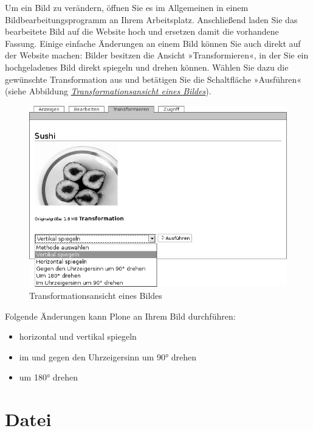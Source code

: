 \documentclass[a4paper,12pt,ngerman]{manual}
\begin{document}
Um ein Bild zu verändern, öffnen Sie es im Allgemeinen in einem
Bildbearbeitungsprogramm an Ihrem Arbeitsplatz. Anschließend laden Sie das
bearbeitete Bild auf die Website hoch und ersetzen damit die vorhandene
Fassung. Einige einfache Änderungen an einem Bild können Sie auch direkt auf
der Website machen: Bilder besitzen die Ansicht »Transformieren«, in der Sie
ein hochgeladenes Bild direkt spiegeln und drehen können. Wählen Sie dazu die
gewünschte Transformation aus und betätigen Sie die Schaltfläche
»Ausführen« (siehe Abbildung \hyperlink{fig-bild-transformieren}{\emph{Transformationsansicht eines Bildes}}).
\hypertarget{fig-bild-transformieren}{}\begin{figure}[htbp]
\centering

\includegraphics{bild-transformieren.png}
\caption{Transformationsansicht eines Bildes}\end{figure}

Folgende Änderungen kann Plone an Ihrem Bild durchführen:
\begin{itemize}
\item {} 
horizontal und vertikal spiegeln

\item {} 
im und gegen den Uhrzeigersinn um 90° drehen

\item {} 
um 180° drehen

\end{itemize}

\resetcurrentobjects
\hypertarget{--doc-inhaltstypen/datei}{}

\hypertarget{sec-datei}{}\section{Datei}
\end{document}
